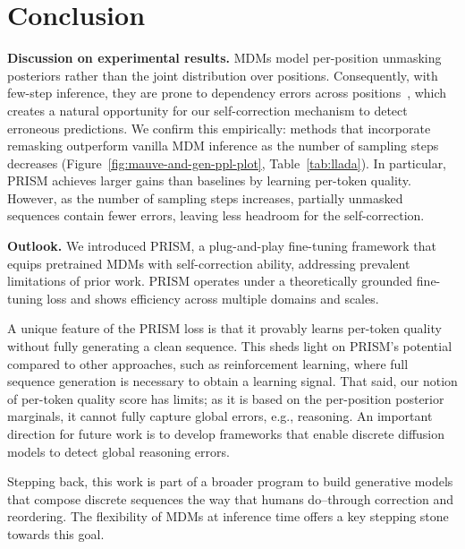 \section{Conclusion}
\textbf{Discussion on experimental results.} 
MDMs model per-position unmasking posteriors rather than the joint distribution over positions. Consequently, with few-step inference, they are prone to dependency errors across positions~\citep{liu2024discrete,xu2024energy,kang2025parallelbench}, which creates a natural opportunity for our self-correction mechanism to detect erroneous predictions. We confirm this empirically: methods that incorporate remasking outperform vanilla MDM inference as the number of sampling steps decreases (Figure~\ref{fig:mauve-and-gen-ppl-plot}, Table~\ref{tab:llada}). In particular, PRISM achieves larger gains than baselines by learning per-token quality. However, as the number of sampling steps increases, partially unmasked sequences contain fewer errors, leaving less headroom for the self-correction.

\textbf{Outlook.} We introduced PRISM, a plug-and-play fine-tuning framework that equips pretrained MDMs with self-correction ability, addressing prevalent limitations of prior work. PRISM operates under a theoretically grounded fine-tuning loss and shows efficiency across multiple domains and scales. 

A unique feature of the PRISM loss is that it provably learns per-token quality without fully generating a clean sequence. This sheds light on PRISM's potential compared to other approaches, such as reinforcement learning, where full sequence generation is necessary to obtain a learning signal. That said, our notion of per-token quality score has limits; as it is based on the per-position posterior marginals, it cannot fully capture global errors, e.g., reasoning. An important direction for future work is to develop frameworks that enable discrete diffusion models to detect global reasoning errors.

Stepping back, this work is part of a broader program to build generative models that compose discrete sequences the way that humans do--through correction and reordering. The flexibility of MDMs at inference time offers a key stepping stone towards this goal.